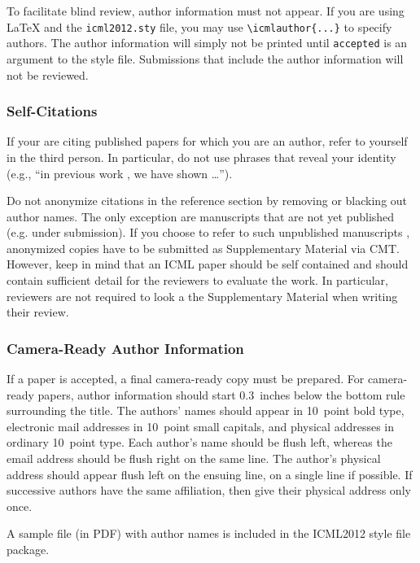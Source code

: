 \documentclass{article}
\begin{document}
To facilitate blind review, author information must not appear.  If
you are using \LaTeX\/ and the \texttt{icml2012.sty} file, you may use
\verb+\icmlauthor{...}+ to specify authors.  The author information
will simply not be printed until {\tt accepted} is an argument to the
style file. Submissions that include the author information will not
be reviewed.

\subsubsection{Self-Citations}

If your are citing published papers for which you are an author, refer
to yourself in the third person. In particular, do not use phrases
that reveal your identity (e.g., ``in previous work \cite{langley00}, we 
have shown \ldots'').

Do not anonymize citations in the reference section by removing or
blacking out author names. The only exception are manuscripts that are
not yet published (e.g. under submission). If you choose to refer to
such unpublished manuscripts \cite{anonymous}, anonymized copies have to be submitted
as Supplementary Material via CMT. However, keep in mind that an ICML
paper should be self contained and should contain sufficient detail
for the reviewers to evaluate the work. In particular, reviewers are
not required to look a the Supplementary Material when writing their
review.

\subsubsection{Camera-Ready Author Information}
\label{final author}

If a paper is accepted, a final camera-ready copy must be prepared.
%
For camera-ready papers, author information should start 0.3~inches
below the bottom rule surrounding the title. The authors' names should
appear in 10~point bold type, electronic mail addresses in 10~point
small capitals, and physical addresses in ordinary 10~point type.
Each author's name should be flush left, whereas the email address
should be flush right on the same line. The author's physical address
should appear flush left on the ensuing line, on a single line if
possible. If successive authors have the same affiliation, then give
their physical address only once.

A sample file (in PDF) with author names is included in the ICML2012 style file package.
\end{document}
